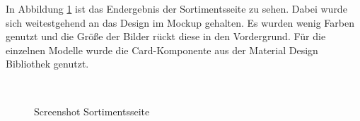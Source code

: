 In Abbildung \ref{fig:screenshot_sortiment} ist das Endergebnis der Sortimentsseite zu sehen. Dabei wurde sich weitestgehend an das Design im Mockup gehalten. Es wurden wenig Farben genutzt und die Größe der Bilder rückt diese in den Vordergrund. Für die einzelnen Modelle wurde die Card-Komponente aus der Material Design Bibliothek genutzt.

\begin{figure}[!htb]
    \centering
    \begin{minipage}[t]{.4\textwidth}
        \caption{Screenshot Sortimentsseite}
        \\
        \label{fig:screenshot_sortiment}
    \end{minipage}
\end{figure}

